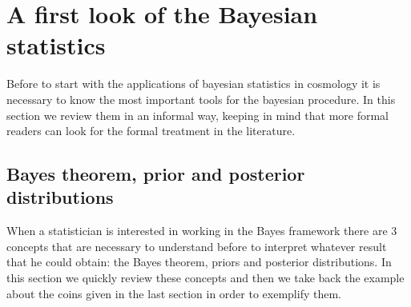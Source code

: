 \documentclass[onecolumn,           %
               showpacs,            %
               preprintnumbers,     %
               aps,                 %
               prl,          	    %
               letterpaper,             %
               superscriptaddress,      %
               nofootinbib,         %
               tightenlines,        %
               floats,floatfix      %
               ,usenatbib,
               ]{revtex4-1}
\begin{document}

\section{A first look of the Bayesian statistics}

Before to start with the applications of bayesian statistics in cosmology it is necessary to know the most important tools for the bayesian procedure. In this section we review them in an informal way, keeping in mind that more formal readers can look for the formal treatment in the literature.   

\subsection{Bayes theorem, prior and posterior distributions}\label{BTPP}

When a statistician is interested in working in the Bayes framework there are 3 concepts that are necessary to understand before to interpret whatever result that he could obtain: the Bayes theorem, priors and posterior distributions. In this section we quickly review these concepts and then we take back the example about the coins given in the last section in order to exemplify them. 
\end{document}
